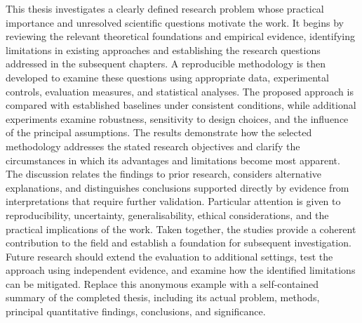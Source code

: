 
This thesis investigates a clearly defined research problem whose practical importance and unresolved scientific questions motivate the work. It begins by reviewing the relevant theoretical foundations and empirical evidence, identifying limitations in existing approaches and establishing the research questions addressed in the subsequent chapters. A reproducible methodology is then developed to examine these questions using appropriate data, experimental controls, evaluation measures, and statistical analyses. The proposed approach is compared with established baselines under consistent conditions, while additional experiments examine robustness, sensitivity to design choices, and the influence of the principal assumptions. The results demonstrate how the selected methodology addresses the stated research objectives and clarify the circumstances in which its advantages and limitations become most apparent. The discussion relates the findings to prior research, considers alternative explanations, and distinguishes conclusions supported directly by evidence from interpretations that require further validation. Particular attention is given to reproducibility, uncertainty, generalisability, ethical considerations, and the practical implications of the work. Taken together, the studies provide a coherent contribution to the field and establish a foundation for subsequent investigation. Future research should extend the evaluation to additional settings, test the approach using independent evidence, and examine how the identified limitations can be mitigated. Replace this anonymous example with a self-contained summary of the completed thesis, including its actual problem, methods, principal quantitative findings, conclusions, and significance.
